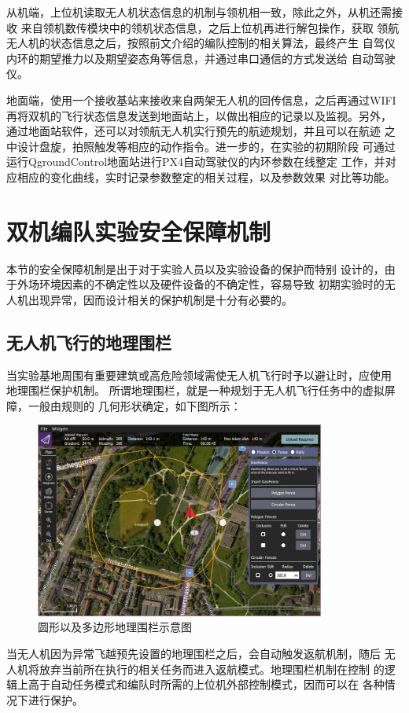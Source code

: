 从机端，上位机读取无人机状态信息的机制与领机相一致，除此之外，从机还需接收
来自领机数传模块中的领机状态信息，之后上位机再进行解包操作，获取
领航无人机的状态信息之后，按照前文介绍的编队控制的相关算法，最终产生
自驾仪内环的期望推力以及期望姿态角等信息，并通过串口通信的方式发送给
自动驾驶仪。

地面端，使用一个接收基站来接收来自两架无人机的回传信息，之后再通过WIFI
再将双机的飞行状态信息发送到地面站上，以做出相应的记录以及监视。另外，
通过地面站软件，还可以对领航无人机实行预先的航迹规划，并且可以在航迹
之中设计盘旋，拍照触发等相应的动作指令。进一步的，在实验的初期阶段
可通过运行QgroundControl地面站进行PX4自动驾驶仪的内环参数在线整定
工作，并对应相应的变化曲线，实时记录参数整定的相关过程，以及参数效果
对比等功能。
\section{双机编队实验安全保障机制}
本节的安全保障机制是出于对于实验人员以及实验设备的保护而特别
设计的，由于外场环境因素的不确定性以及硬件设备的不确定性，容易导致
初期实验时的无人机出现异常，因而设计相关的保护机制是十分有必要的。
\subsection{无人机飞行的地理围栏}
当实验基地周围有重要建筑或高危险领域需使无人机飞行时予以避让时，应使用
地理围栏保护机制。
所谓地理围栏，就是一种规划于无人机飞行任务中的虚拟屏障，一般由规则的
几何形状确定，如下图所示：
\begin{figure}[H]
    \centering
    \includegraphics[width=0.85\textwidth]{figures/adds/geofence_overview}
    \caption{圆形以及多边形地理围栏示意图}\label{fig:c5-geofence_overview}
\end{figure}
当无人机因为异常飞越预先设置的地理围栏之后，会自动触发返航机制，随后
无人机将放弃当前所在执行的相关任务而进入返航模式。地理围栏机制在控制
的逻辑上高于自动任务模式和编队时所需的上位机外部控制模式，因而可以在
各种情况下进行保护。
